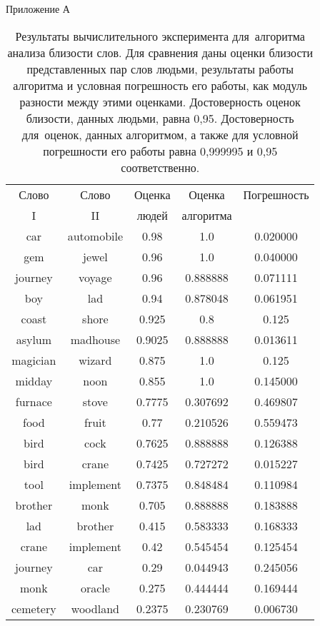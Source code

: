 Приложение А
\begin{table}[p]
\caption{
Результаты вычислительного эксперимента для~алгоритма анализа 
близости слов.
Для сравнения даны оценки близости представленных пар слов людьми, 
результаты работы алгоритма и условная погрешность его работы, как модуль разности между этими оценками.
Достоверность оценок близости, данных людьми, равна 0,95. Достоверность для~оценок,
данных алгоритмом, а также для условной погрешности его работы равна 0,999995 и 0,95 соответственно. 
}
\label{table_result}
\begin{center}
{\Large
\begin{tabular}{|c|c|c|c|c|}
\hline
Слово & Слово & Оценка & Оценка & Погрешность  \\
I & II & людей & алгоритма &  \\
\hline
car & automobile & 0.98 & 1.0 & 0.020000 \\
\hline
gem & jewel & 0.96 & 1.0 & 0.040000 \\
\hline
journey & voyage & 0.96 & 0.888888 & 0.071111 \\
\hline
boy & lad & 0.94 & 0.878048 & 0.061951 \\
\hline
coast & shore & 0.925 & 0.8 & 0.125 \\
\hline
asylum & madhouse & 0.9025 & 0.888888 & 0.013611 \\
\hline
magician & wizard & 0.875 & 1.0 & 0.125 \\
\hline
midday & noon & 0.855 & 1.0 & 0.145000 \\
\hline
furnace & stove & 0.7775 & 0.307692 & 0.469807 \\
\hline
food & fruit & 0.77 & 0.210526 & 0.559473 \\
\hline
bird & cock & 0.7625 & 0.888888 & 0.126388 \\
\hline
bird & crane & 0.7425 & 0.727272 & 0.015227 \\
\hline
tool & implement & 0.7375 & 0.848484 & 0.110984 \\
\hline
brother & monk & 0.705 & 0.888888 & 0.183888 \\
\hline
lad & brother & 0.415 & 0.583333 & 0.168333 \\
\hline
crane & implement & 0.42 & 0.545454 & 0.125454 \\
\hline
journey & car & 0.29 & 0.044943 & 0.245056 \\
\hline
monk & oracle & 0.275 & 0.444444 & 0.169444 \\
\hline
cemetery & woodland & 0.2375 & 0.230769 & 0.006730 \\

\end{tabular}}
\end{center}
\end{table}
